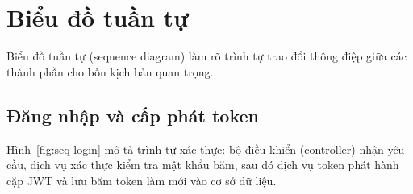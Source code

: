 
\section{Biểu đồ tuần tự}
\label{sec:bieu-do-tuan-tu}

Biểu đồ tuần tự (sequence diagram) làm rõ trình tự trao đổi thông điệp giữa
các thành phần cho bốn kịch bản quan trọng.

\subsection{Đăng nhập và cấp phát token}
\label{subsec:seq-login}

Hình~\ref{fig:seq-login} mô tả trình tự xác thực: bộ điều khiển (controller)
nhận yêu cầu, dịch vụ xác thực kiểm tra mật khẩu băm, sau đó dịch vụ token
phát hành cặp JWT và lưu băm token làm mới vào cơ sở dữ liệu.


